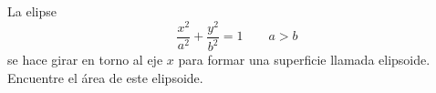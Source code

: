 \item La elipse
    \[ \frac{x^2}{a^2} + \frac{y^2}{b^2} = 1 \qquad a > b \]
    se hace girar en torno al eje $x$ para formar una superficie llamada elipsoide. Encuentre el área de este elipsoide.
